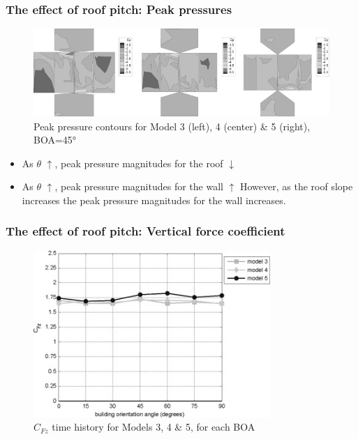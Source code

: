 \documentclass{beamer}
\begin{document}
\begin{frame}
	\frametitle{The effect of roof pitch: Peak pressures}
	\begin{figure}
		\centering
		\includegraphics[width=\textwidth]{./fig/7.jpg}
		\caption{Peak pressure contours for Model 3 (left), 4 (center) \& 5 (right), BOA=\ang{45}}
	\end{figure}
	\begin{itemize}
		\item<2-> As $\theta$ $\uparrow$, peak pressure magnitudes for the \alert{roof} $\downarrow$
		\item<3-> As $\theta$ $\uparrow$, peak pressure magnitudes for the \alert{wall} $\uparrow$
			 {However, as the roof slope increases the peak pressure magnitudes for the wall increases.}
	\end{itemize}
\end{frame}

\begin{frame}
	\frametitle{The effect of roof pitch: Vertical force coefficient}
	\begin{figure}
		\includegraphics[width=0.8\textwidth]{./fig/8.jpg}
		\caption{$C_{Fz}$ time history for Models 3, 4 \& 5, for each BOA}
	\end{figure}
\end{frame}
\end{document}

